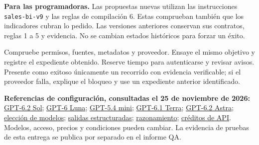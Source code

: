 \documentclass[11pt,a4paper]{article}
\newcommand{\subtitulo}[1]{\par\vspace{2mm}{\large\color{navy}\textbf{#1}}\par}
\begin{document}
\textbf{Para las programadoras.} Las propuestas nuevas utilizan las instrucciones
\texttt{sales-bi-v9} y las reglas de compilación 6. Estas comprueban también que
los indicadores cubran lo pedido. Las versiones anteriores conservan sus contratos,
reglas 1 a 5 y evidencia. No se cambian estados históricos para forzar un éxito.

\subtitulo{Antes de una demostración}
Compruebe permisos, fuentes, metadatos y proveedor. Ensaye el mismo objetivo y
registre el expediente obtenido. Reserve tiempo para autenticarse y revisar avisos.
Presente como exitoso únicamente un recorrido con evidencia verificable; si el
proveedor falla, explique el bloqueo y use un expediente anterior identificado.

{\footnotesize\color{muted}\textbf{Referencias de configuración, consultadas el 25 de noviembre de 2026:}
\href{https://developers.openai.com/api/docs/models/gpt-6.2-sol}{GPT-6.2 Sol};
\href{https://developers.openai.com/api/docs/models/gpt-6-luna}{GPT-6 Luna};
\href{https://developers.openai.com/api/docs/models/gpt-5.4-mini}{GPT-5.4 mini};
\href{https://developers.openai.com/api/docs/models/gpt-6.1-terra}{GPT-6.1 Terra};
\href{https://developers.openai.com/api/docs/models/gpt-6.2-astra}{GPT-6.2 Astra};
\href{https://developers.openai.com/api/docs/guides/latest-model}{elección de modelos};
\href{https://developers.openai.com/api/docs/guides/structured-outputs}{salidas estructuradas};
\href{https://developers.openai.com/api/docs/guides/reasoning}{razonamiento};
\href{https://developers.openai.com/api/docs/guides/chatgpt-api-credits}{créditos de API}.
Modelos, acceso, precios y condiciones pueden cambiar.
La evidencia de pruebas de esta entrega se publica por separado en el informe QA.}
\end{document}
